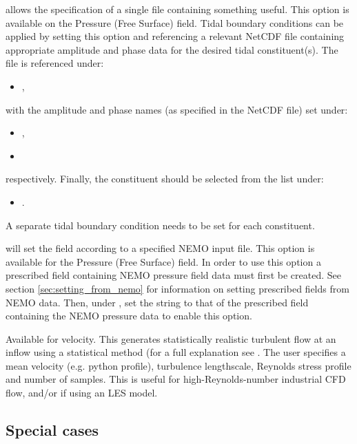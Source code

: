  allows the specification of a single file
containing something useful. This option is available on the Pressure (Free
Surface) field. Tidal boundary conditions can be applied by setting this option
and referencing a relevant NetCDF file containing appropriate amplitude and phase data for the desired
tidal constituent(s). The file is referenced under:
\begin{itemize}
\item {},
\end{itemize}
with the amplitude and phase names (as specified in the NetCDF file) set under:
\begin{itemize}
\item {},
\item {}
\end{itemize}
respectively. Finally, the constituent should be selected from the list under:
\begin{itemize}
\item {}.
\end{itemize}
A separate tidal boundary condition needs to be set for each constituent.

 will set the field according to a specified NEMO
input file. This option is available for the Pressure (Free Surface) field.
In order to use this option a prescribed field containing NEMO pressure
field data must first be created. See section \ref{sec:setting_from_nemo}
for information on setting prescribed fields from NEMO data. Then, under
, set the string to that of the prescribed
field containing the NEMO pressure data to enable this option.

 Available for velocity.
This generates statistically realistic turbulent flow at an inflow using a
statistical method (for a full explanation see \cite{jarrin_06}.
The user specifies a mean velocity (e.g. python profile),
turbulence lengthscale, Reynolds stress profile and number of samples.
This is useful for high-Reynolds-number industrial CFD flow, and/or if using an LES model.

\subsection{Special cases}\label{sec:BCs:special}

